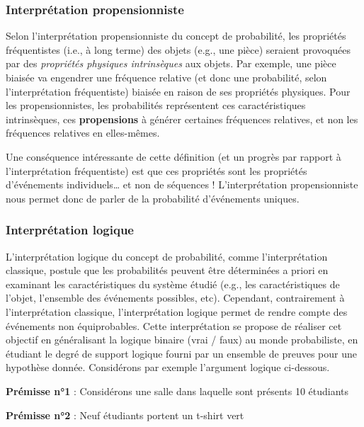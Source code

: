 \documentclass[
  a4paper,11pt,twoside,onecolumn,openright,final,oldfontcommands]{memoir}
\theoremstyle{definition}
\theoremstyle{definition}
\theoremstyle{definition}
\theoremstyle{remark}
\begin{document}
\hypertarget{interpruxe9tation-propensionniste}{%
\subsubsection{Interprétation propensionniste}\label{interpruxe9tation-propensionniste}}

Selon l'interprétation propensionniste du concept de probabilité, les propriétés fréquentistes (i.e., à long terme) des objets (e.g., une pièce) seraient provoquées par des \emph{propriétés physiques intrinsèques} aux objets. Par exemple, une pièce biaisée va engendrer une fréquence relative (et donc une probabilité, selon l'interprétation fréquentiste) biaisée en raison de ses propriétés physiques. Pour les propensionnistes, les probabilités représentent ces caractéristiques intrinsèques, ces \textbf{propensions} à générer certaines fréquences relatives, et non les fréquences relatives en elles-mêmes.

Une conséquence intéressante de cette définition (et un progrès par rapport à l'interprétation fréquentiste) est que ces propriétés sont les propriétés d'événements individuels\ldots{} et non de séquences ! L'interprétation propensionniste nous permet donc de parler de la probabilité d'événements uniques.

\hypertarget{interpruxe9tation-logique}{%
\subsubsection{Interprétation logique}\label{interpruxe9tation-logique}}

L'interprétation logique du concept de probabilité, comme l'interprétation classique, postule que les probabilités peuvent être déterminées a priori en examinant les caractéristiques du système étudié (e.g., les caractéristiques de l'objet, l'ensemble des événements possibles, etc). Cependant, contrairement à l'interprétation classique, l'interprétation logique permet de rendre compte des événements non équiprobables. Cette interprétation se propose de réaliser cet objectif en généralisant la logique binaire (vrai / faux) au monde probabiliste, en étudiant le degré de support logique fourni par un ensemble de preuves pour une hypothèse donnée. Considérons par exemple l'argument logique ci-dessous.

\textbf{Prémisse n°1} : Considérons une salle dans laquelle sont présents 10 étudiants

\textbf{Prémisse n°2} : Neuf étudiants portent un t-shirt vert
\end{document}
